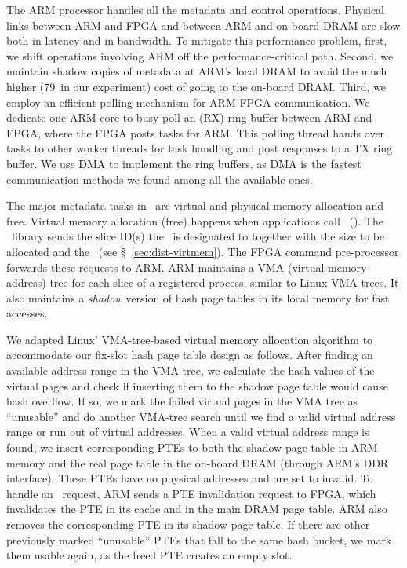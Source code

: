 The ARM processor handles all the metadata and control operations.
Physical links between ARM and FPGA and between ARM and on-board DRAM are slow both in latency and in bandwidth.
To mitigate this performance problem, 
first, we shift operations involving ARM off the performance-critical path.
Second, we maintain shadow copies of metadata at ARM's local DRAM 
to avoid the much higher (79\x\ in our experiment) cost of going to the on-board DRAM.
Third, we employ an efficient polling mechanism for ARM-FPGA communication.
We dedicate one ARM core to busy poll an (RX) ring buffer between ARM and FPGA,
where the FPGA posts tasks for ARM.
This polling thread hands over tasks to other worker threads for task handling %
and post responses to a TX ring buffer.
We use DMA to implement the ring buffers, 
as DMA is the fastest communication methods we found among all the available ones.

The major metadata tasks in \sys\ are virtual and physical memory allocation and free.
Virtual memory allocation (free) happens when applications call \alloc\ (\free).
The \sys\ library sends the slice ID(s) the \alloc\ is designated to 
together with the size to be allocated and the \pid\ (see \S~\ref{sec:dist-virtmem}).
The FPGA command pre-processor forwards these requests to ARM.
ARM maintains a VMA (virtual-memory-address) tree for each slice of a registered process,
similar to Linux VMA trees.
It also maintains a {\em shadow} version of hash page tables in its local memory for fast accesses.

We adapted Linux' VMA-tree-based virtual memory allocation algorithm to accommodate our fix-slot hash page table design as follows.
After finding an available address range in the VMA tree, we calculate the hash values of the
virtual pages and check if inserting them to the shadow page table would cause hash overflow. 
If so, we mark the failed virtual pages in the VMA tree as ``unusable'' and do another VMA-tree search
until we find a valid virtual address range or run out of virtual addresses.
When a valid virtual address range is found, we insert corresponding PTEs to both the shadow page table in ARM memory
and the real page table in the on-board DRAM (through ARM's DDR interface).
These PTEs have no physical addresses and are set to invalid.
To handle an \free\ request, ARM sends a PTE invalidation request to FPGA,
which invalidates the PTE in its cache and in the main DRAM page table.
ARM also removes the corresponding PTE in its shadow page table.
If there are other previously marked ``unusable'' PTEs that fall to the same hash 
bucket, we mark them usable again, as the freed PTE creates an empty slot.

